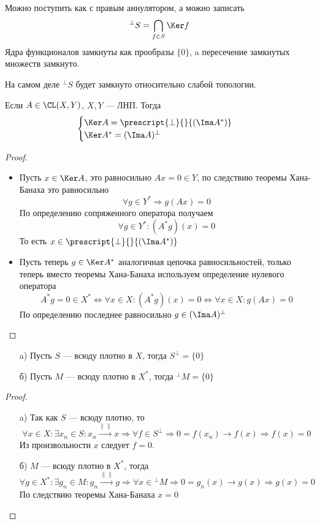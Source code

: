 \begin{definition}
	Можно поступить как с правым аннулятором, а можно записать 
	$$
	^\perp S = \bigcap_{f \in S}\Ker f 
	$$
	Ядра функционалов замкнуты как прообразы $\{0\}$, a пересечение замкнутых множеств замкнуто.
\end{definition}
\begin{remark}
	На самом деле $^\perp S$ будет замкнуто относительно слабой топологии.
\end{remark}
\begin{theorem}[Фредгольм]\label{th:fr}
	Если $A \in \CL(X,Y)$, $X,Y$ --- ЛНП. Тогда
	$$
	\begin{cases}
		\Ker A = \prescript{\perp}{}{(\Ima A^*)} \\   
		\Ker A^* = (\Ima A)^\perp
	\end{cases}
	$$
\end{theorem}
\begin{proof}
 \begin{itemize}
 	\item Пусть $ x \in \Ker A$, это равносильно $Ax = 0 \in Y$, по следствию теоремы Хана-Банаха это равносильно 
 $$
 \forall g \in Y^* \Rightarrow g(Ax) = 0
 $$
 По определению сопряженного оператора получаем 
 $$\forall g \in Y^* \colon (A^*g)(x) = 0$$
 То есть $x \in \prescript{\perp}{}{(\Ima A^*)} $
 \item Пусть теперь $g \in \Ker A^*$ аналогичная цепочка равносильностей, только теперь вместо теоремы Хана-Банаха используем определение нулевого оператора
 $$
 A^*g = 0 \in X^* \Leftrightarrow \forall x \in X\colon (A^*g)(x) = 0 \Leftrightarrow \forall x \in X\colon g(Ax) = 0
 $$
 По определению последнее равносильно $g \in (\Ima A)^\perp$
 \end{itemize}
\end{proof}
\begin{lemma}\label{lem:densyty}
	\hfill
\begin{enumerate}
	\item[a)] 	Пусть $S$ --- всюду плотно в $X$, тогда $S^\perp = \{0\}$
	\item[б)] Пусть $M$ --- всюду плотно в $X^*$, тогда $^\perp M  = \{0\}$
\end{enumerate}
\end{lemma}
\begin{proof}
	\begin{enumerate}
		\item[a)] Так как $S$ --- всюду плотно, то
		$$
		\forall x \in X \colon \exists x_n \in S\colon x_n \xrightarrow{\|\|} x \Rightarrow \forall f \in S^\perp \Rightarrow 0  = f(x_n) \to f(x) \Rightarrow f(x) = 0
		$$
		Из произвольности $x$ следует  $f = 0 $. 
		\item[б)] $M$ --- всюду плотно в $X^*$, тогда
		$$
		\forall g \in X^*: \exists g_n \in M \colon g_n \xrightarrow{\|\|} g \Rightarrow \forall x \in {}^\perp M \Rightarrow 0  = g_n(x) \to g(x) \Rightarrow g(x) = 0
		$$
		По следствию теоремы Хана-Банаха $x = 0$
	\end{enumerate}
\end{proof}
